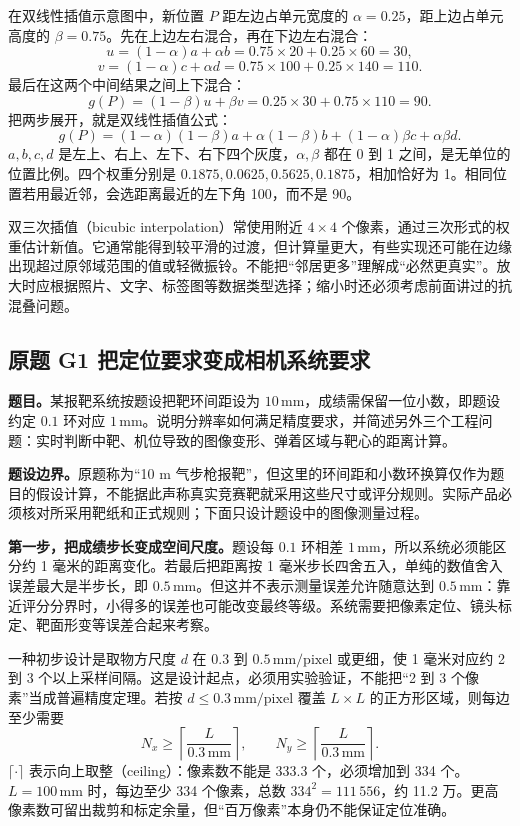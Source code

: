 在双线性插值示意图中，新位置 $P$ 距左边占单元宽度的 $\alpha=0.25$，距上边占单元高度的 $\beta=0.75$。先在上边左右混合，再在下边左右混合：
\[
 u=(1-\alpha)a+\alpha b=0.75\times20+0.25\times60=30,
\]
\[
 v=(1-\alpha)c+\alpha d=0.75\times100+0.25\times140=110.
\]
最后在这两个中间结果之间上下混合：
\[
 g(P)=(1-\beta)u+\beta v=0.25\times30+0.75\times110=90.
\]
把两步展开，就是双线性插值公式：
\[
 g(P)=(1-\alpha)(1-\beta)a+\alpha(1-\beta)b
       +(1-\alpha)\beta c+\alpha\beta d.
\]
$a,b,c,d$ 是左上、右上、左下、右下四个灰度，$\alpha,\beta$ 都在 0 到 1 之间，是无单位的位置比例。四个权重分别是 $0.1875,0.0625,0.5625,0.1875$，相加恰好为 1。相同位置若用最近邻，会选距离最近的左下角 100，而不是 90。

双三次插值（bicubic interpolation）常使用附近 $4\times4$ 个像素，通过三次形式的权重估计新值。它通常能得到较平滑的过渡，但计算量更大，有些实现还可能在边缘出现超过原邻域范围的值或轻微振铃。不能把“邻居更多”理解成“必然更真实”。放大时应根据照片、文字、标签图等数据类型选择；缩小时还必须考虑前面讲过的抗混叠问题。

\subsection*{原题 G1 把定位要求变成相机系统要求}
\label{original:G1}
\textbf{题目。}某报靶系统按题设把靶环间距设为 $10\,\mathrm{mm}$，成绩需保留一位小数，即题设约定 $0.1$ 环对应 $1\,\mathrm{mm}$。说明分辨率如何满足精度要求，并简述另外三个工程问题：实时判断中靶、机位导致的图像变形、弹着区域与靶心的距离计算。

\textbf{题设边界。}原题称为“10 m 气步枪报靶”，但这里的环间距和小数环换算仅作为题目的假设计算，不能据此声称真实竞赛靶就采用这些尺寸或评分规则。实际产品必须核对所采用靶纸和正式规则；下面只设计题设中的图像测量过程。

\textbf{第一步，把成绩步长变成空间尺度。}题设每 $0.1$ 环相差 $1\,\mathrm{mm}$，所以系统必须能区分约 1 毫米的距离变化。若最后把距离按 1 毫米步长四舍五入，单纯的数值舍入误差最大是半步长，即 $0.5\,\mathrm{mm}$。但这并不表示测量误差允许随意达到 $0.5\,\mathrm{mm}$：靠近评分分界时，小得多的误差也可能改变最终等级。系统需要把像素定位、镜头标定、靶面形变等误差合起来考察。

一种初步设计是取物方尺度 $d$ 在 $0.3$ 到 $0.5\,\mathrm{mm/pixel}$ 或更细，使 1 毫米对应约 2 到 3 个以上采样间隔。这是设计起点，必须用实验验证，不能把“2 到 3 个像素”当成普遍精度定理。若按 $d\leq0.3\,\mathrm{mm/pixel}$ 覆盖 $L\times L$ 的正方形区域，则每边至少需要
\[
 N_x\geq\left\lceil\frac{L}{0.3\,\mathrm{mm}}\right\rceil,
 \qquad N_y\geq\left\lceil\frac{L}{0.3\,\mathrm{mm}}\right\rceil.
\]
$\lceil\cdot\rceil$ 表示向上取整（ceiling）：像素数不能是 333.3 个，必须增加到 334 个。$L=100\,\mathrm{mm}$ 时，每边至少 334 个像素，总数 $334^2=111\,556$，约 11.2 万。更高像素数可留出裁剪和标定余量，但“百万像素”本身仍不能保证定位准确。

